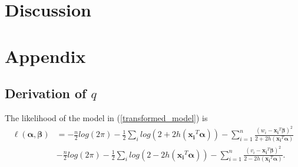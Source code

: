 \documentclass[12pt]{article}
\theoremstyle{theorem}
\begin{document}


\section{Discussion}



\section{Appendix}
\subsection{Derivation of $q$}
The likelihood of the model in (\ref{transformed_model}) is
\begin{align*}
\ell(\bm{\alpha, \beta}) &= -\frac{n}{2} log(2\pi) - \frac{1}{2} \sum_i log(2 + 2h(\bm{x_i}^T \bm{\alpha})) - \sum_{i=1}^{n} \frac{(w_i - \bm{x_i}^T \bm{\beta})^2}{2 + 2h(\bm{x_i}^T \bm{\alpha})} \\
&-\frac{n}{2} log(2\pi) - \frac{1}{2} \sum_i log(2 - 2h(\bm{x_i}^T \bm{\alpha})) - \sum_{i=1}^{n} \frac{(v_i - \bm{x_i}^T \bm{\beta})^2}{2 - 2h(\bm{x_i}^T \bm{\alpha})}.
\end{align*}
\end{document}
